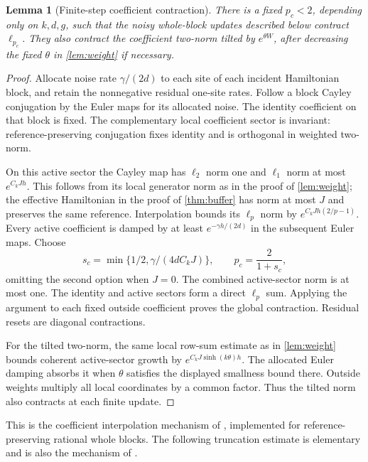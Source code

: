 \documentclass[11pt,reqno]{amsart}
\numberwithin{equation}{section}
\newtheorem{lemma}[theorem]{Lemma}
\theoremstyle{definition}
\theoremstyle{remark}
\begin{document}
\begin{lemma}[Finite-step coefficient contraction]\label{lem:coefficient}
There is a fixed $p_c<2$, depending only on $k,d,g$, such that the noisy whole-block updates described below contract $\ell_{p_c}$. They also contract the coefficient two-norm tilted by $e^{\theta W}$, after decreasing the fixed $\theta$ in \cref{lem:weight} if necessary.
\end{lemma}
\begin{proof}
Allocate noise rate $\gamma/(2d)$ to each site of each incident Hamiltonian block, and retain the nonnegative residual one-site rates. Follow a block Cayley conjugation by the Euler maps for its allocated noise. The identity coefficient on that block is fixed. The complementary local coefficient sector is invariant: reference-preserving conjugation fixes identity and is orthogonal in weighted two-norm.

On this active sector the Cayley map has $\ell_2$ norm one and $\ell_1$ norm at most $e^{C_kJh}$. This follows from its local generator norm as in the proof of \cref{lem:weight}; the effective Hamiltonian in the proof of \cref{thm:buffer} has norm at most $J$ and preserves the same reference. Interpolation bounds its $\ell_p$ norm by $e^{C_kJh(2/p-1)}$. Every active coefficient is damped by at least $e^{-\gamma h/(2d)}$ in the subsequent Euler maps. Choose
\[
 s_c=\min\{1/2,\gamma/(4dC_kJ)\},\qquad
 p_c=\frac2{1+s_c},
\]
omitting the second option when $J=0$. The combined active-sector norm is at most one. The identity and active sectors form a direct $\ell_p$ sum. Applying the argument to each fixed outside coefficient proves the global contraction. Residual resets are diagonal contractions.

For the tilted two-norm, the same local row-sum estimate as in \cref{lem:weight} bounds coherent active-sector growth by $e^{C_kJ\sinh(k\theta)h}$. The allocated Euler damping absorbs it when $\theta$ satisfies the displayed smallness bound there. Outside weights multiply all local coordinates by a common factor. Thus the tilted norm also contracts at each finite update.
\end{proof}

This is the coefficient interpolation mechanism of \cite[Lemma~S15 and Corollary~S16]{APTH}, implemented for reference-preserving rational whole blocks. The following truncation estimate is elementary and is also the mechanism of \cite[Lemma~S6]{APTH}.
\end{document}
